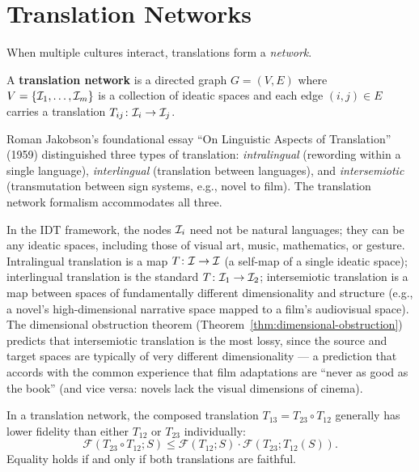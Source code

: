 \section{Translation Networks}

When multiple cultures interact, translations form a \emph{network}.

\begin{definition}
\label{def:translation-network}
A \textbf{translation network} is a directed graph $G = (V, E)$ where
$V = \{\mathcal{I}_1, \ldots, \mathcal{I}_m\}$ is a collection of ideatic spaces and each
edge $(i, j) \in E$ carries a translation $T_{ij}\colon \mathcal{I}_i \to \mathcal{I}_j$.
\end{definition}

\begin{interpretation}
\label{interp:ch18:jakobson_three_types}
Roman Jakobson's foundational essay ``On Linguistic Aspects of Translation''
(1959) distinguished three types of translation: \emph{intralingual} (rewording
within a single language), \emph{interlingual} (translation between languages),
and \emph{intersemiotic} (transmutation between sign systems, e.g., novel to
film).  The translation network formalism accommodates all three.

In the IDT framework, the nodes $\mathcal{I}_i$ need not be natural languages;
they can be any ideatic spaces, including those of visual art, music,
mathematics, or gesture.  Intralingual translation is a map $T\colon \mathcal{I}
\to \mathcal{I}$ (a self-map of a single ideatic space); interlingual translation
is the standard $T\colon \mathcal{I}_1 \to \mathcal{I}_2$; intersemiotic translation is
a map between spaces of fundamentally different dimensionality and structure
(e.g., a novel's high-dimensional narrative space mapped to a film's
audiovisual space).  The dimensional obstruction theorem
(Theorem~\ref{thm:dimensional-obstruction}) predicts that intersemiotic
translation is the most lossy, since the source and target spaces are
typically of very different dimensionality --- a prediction that accords
with the common experience that film adaptations are ``never as good as
the book'' (and vice versa: novels lack the visual dimensions of cinema).
\end{interpretation}

\begin{theorem}
\label{thm:transitivity-loss}
In a translation network, the composed translation
$T_{13} = T_{23} \circ T_{12}$ generally has lower fidelity than either
$T_{12}$ or $T_{23}$ individually:
\[
  \mathcal{F}(T_{23} \circ T_{12}; S) \leq
  \mathcal{F}(T_{12}; S) \cdot \mathcal{F}(T_{23}; T_{12}(S)).
\]
Equality holds if and only if both translations are faithful.
\end{theorem}

